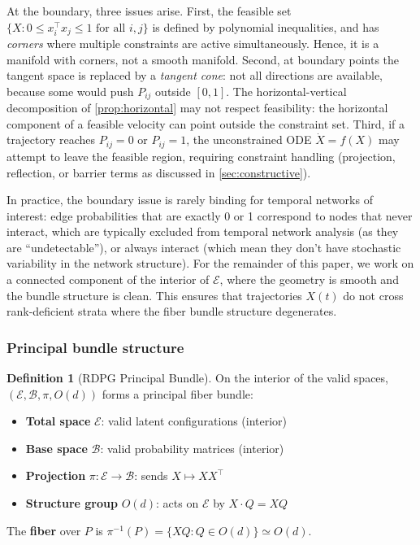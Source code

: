 \documentclass{article}
\theoremstyle{plain}
\theoremstyle{definition}
\newtheorem{definition}{Definition}
\theoremstyle{remark}
\begin{document}
At the boundary, three issues arise.
First, the feasible set $\{X : 0 \le x_i^\top x_j \le 1 \text{ for all } i, j\}$ is defined by polynomial inequalities, and has \emph{corners} where multiple constraints are active simultaneously. Hence, it is a manifold with corners, not a smooth manifold.
Second, at boundary points the tangent space is replaced by a \emph{tangent cone}: not all directions are available, because some would push $P_{ij}$ outside $[0, 1]$.
The horizontal-vertical decomposition of \cref{prop:horizontal} may not respect feasibility: the horizontal component of a feasible velocity can point outside the constraint set.
Third, if a trajectory reaches $P_{ij} = 0$ or $P_{ij} = 1$, the unconstrained ODE $\dot{X} = f(X)$ may attempt to leave the feasible region, requiring constraint handling (projection, reflection, or barrier terms as discussed in \cref{sec:constructive}).

In practice, the boundary issue is rarely binding for temporal networks of interest: edge probabilities that are exactly 0 or 1 correspond to nodes that never interact, which are typically excluded from temporal network analysis (as they are ``undetectable''), or always interact (which mean they don't have stochastic variability in the network structure).
For the remainder of this paper, we work on a connected component of the interior of $\mathcal{E}$, where the geometry is smooth and the bundle structure is clean.
This ensures that trajectories $X(t)$ do not cross rank-deficient strata where the fiber bundle structure degenerates.

\subsubsection{Principal bundle structure}

\begin{definition}[RDPG Principal Bundle]
On the interior of the valid spaces, $(\mathcal{E}, \mathcal{B}, \pi, O(d))$ forms a principal fiber bundle:
\begin{itemize}
\item \textbf{Total space} $\mathcal{E}$: valid latent configurations (interior)
\item \textbf{Base space} $\mathcal{B}$: valid probability matrices (interior)
\item \textbf{Projection} $\pi: \mathcal{E} \to \mathcal{B}$: sends $X \mapsto XX^\top$
\item \textbf{Structure group} $O(d)$: acts on $\mathcal{E}$ by $X \cdot Q = XQ$
\end{itemize}

The \textbf{fiber} over $P$ is $\pi^{-1}(P) = \{XQ : Q \in O(d)\} \simeq O(d)$.
\end{definition}
\end{document}
